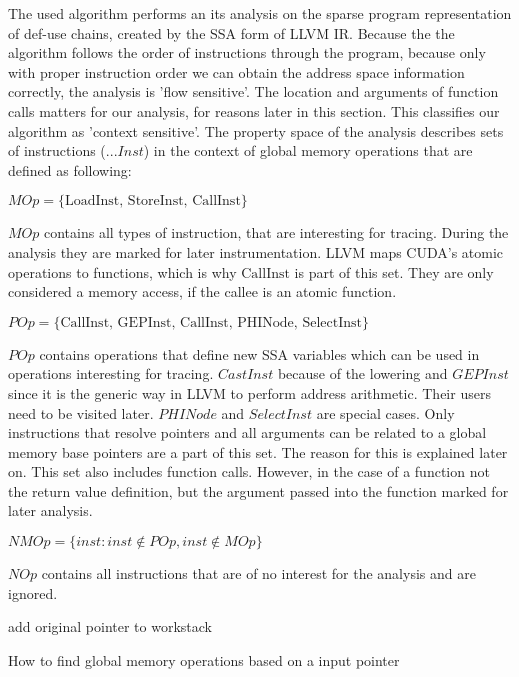 The used algorithm performs an its analysis on the sparse program representation of def-use chains, created by the SSA form of LLVM IR. Because the the algorithm follows the order of instructions through the program, because only with proper instruction order we can obtain the address space information correctly, the analysis is 'flow sensitive'. The location and arguments of function calls matters for our analysis, for reasons later in this section. This classifies our algorithm as 'context sensitive'.
The property space of the analysis describes sets of instructions ($...Inst$) in the context of global memory operations that are defined
as following:
\begin{defi}\label{mop}
	$	MOp = \{\textrm{LoadInst, StoreInst, CallInst}\} $
\end{defi}
$MOp$ contains all types of instruction, that are interesting for tracing. During the analysis they are marked for later instrumentation. LLVM maps CUDA's atomic operations to functions, which is why $\textrm{CallInst}$ is part of this set. They are only considered a memory access, if the callee is an atomic function.
\begin{defi}\label{mopp}
	$   POp = \{\textrm{CallInst, GEPInst, CallInst, PHINode, SelectInst}\} $
\end{defi}
$POp$ contains operations that define new SSA variables which can be used in operations interesting for tracing. $CastInst$ because of the lowering  and $GEPInst$ since it is the generic way in LLVM
to perform address arithmetic. Their users need to be visited later. 
$PHINode$ and $SelectInst$ are special cases. Only instructions that resolve pointers and all arguments can be related to a global memory base pointers are a part of this set. The reason for
this is explained later on.
This set also includes function calls. However, in the case of a function not the return value definition, but the argument passed into the function marked for later analysis.
\begin{defi}\label{nmop}
	$	NMOp = \{inst : inst \notin POp, inst \notin MOp\}$
\end{defi}
$NOp$ contains all instructions that are of no interest for the analysis and are ignored.
\begin{algorithm}[t]
	add original pointer to workstack\;
\caption{How to find global memory operations based on a input pointer}
\label{anal-algo}
\end{algorithm}

